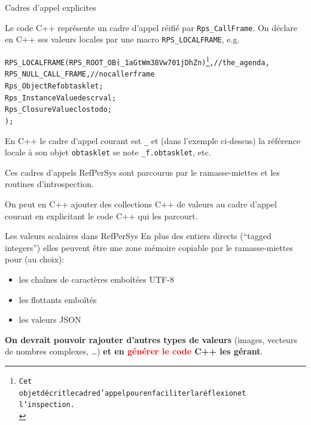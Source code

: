 \documentclass[final,a4,xcolor={svgnames,dvipsnames}]{beamer}
\begin{document}
 \begin{frame}{Cadres d'appel explicites}
   
   Le code C++ représente un cadre d'appel réifié par
   \texttt{Rps\_CallFrame}. On déclare en C++ ses valeurs locales par une macro \texttt{RPS\_LOCALFRAME}, e.g.

   \begin{relsize}{-1}
   \begin{alltt}
     RPS\_LOCALFRAME(RPS\_ROOT\_OB(\_1aGtWm38Vw701jDhZn)\footnote{Cet
     objet décrit le cadre d'appel pour en faciliter la réflexion et
     l'inspection.\medskip\\}, //the\_agenda,\\
     \hspace{8em}            RPS\_NULL\_CALL\_FRAME, // no caller frame\\
     \hspace{8em}            Rps\_ObjectRef obtasklet;\\
     \hspace{8em}            Rps\_InstanceValue descrval;\\
     \hspace{8em}            Rps\_ClosureValue clostodo;\\
                );
   \end{alltt}
   \end{relsize}
   
   En C++ le cadre d'appel courant est \texttt{\_} et (dans l'exemple ci-dessus) la référence locale à son objet \texttt{obtasklet} se note \texttt{\_f.obtasklet}, etc.
   
   Ces cadres d'appels RefPerSys sont parcourus par le ramasse-miettes et les routines d'introspection.

   On peut en C++ ajouter des collections C++ de valeurs au cadre
   d'appel courant en explicitant le code C++ qui les parcourt.
 \end{frame}

 
 \begin{frame}{Les valeurs scalaires dans RefPerSys}
   En plus des entiers directs (``tagged integers'') elles peuvent être une zone mémoire copiable par le ramasse-miettes pour (au choix):

   \begin{itemize}
     \item les chaînes de caractères emboîtées UTF-8 
     \item les flottants emboîtés
     \item les valeurs JSON
   \end{itemize}

   \bigskip
  
  \textbf{On devrait pouvoir rajouter d'autres types de valeurs}
  (images, vecteurs de nombres complexes, \ldots) \textbf{et en
    \textcolor{red}{générer le code} C++ les gérant}.
 \end{frame}
 
\end{document}
